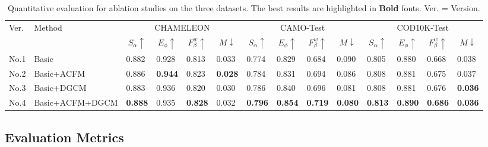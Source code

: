 \documentclass{article}
\begin{document}
\begin{table*}[h]
\caption{Quantitative evaluation for ablation studies on the three datasets. The best results are highlighted in \textbf{Bold} fonts. Ver. = Version.} \vspace{-0.25cm}
\renewcommand{\arraystretch}{0.75}
\setlength\tabcolsep{5.6pt}
\footnotesize
\begin{tabular}{l|l|llll|llll|llll}
\hline\toprule
\multirow{2}{*}{Ver.} & \multicolumn{1}{l|}{\multirow{2}{*}{Method}} & \multicolumn{4}{c|}{CHAMELEON} & \multicolumn{4}{c|}{CAMO-Test} & \multicolumn{4}{c}{COD10K-Test} \\ \cline{3-14} 
 & \multicolumn{1}{c|}{} & \multicolumn{1}{c}{$S_\alpha\uparrow$} & \multicolumn{1}{c}{$E_\phi\uparrow$} & \multicolumn{1}{c}{$F_\beta^w\uparrow$} & \multicolumn{1}{c|}{$M\downarrow$} & \multicolumn{1}{c}{$S_\alpha\uparrow$} & \multicolumn{1}{c}{$E_\phi\uparrow$} & \multicolumn{1}{c}{$F_\beta^w\uparrow$} & \multicolumn{1}{c|}{$M\downarrow$} & \multicolumn{1}{c}{$S_\alpha\uparrow$} & \multicolumn{1}{c}{$E_\phi\uparrow$} & \multicolumn{1}{c}{$F_\beta^w\uparrow$} & \multicolumn{1}{c}{$M\downarrow$} \\ \midrule
No.1 & Basic &0.882  &0.928  &0.813  &0.033  &0.774  &0.829  &0.684  &0.090  &0.805  &0.880  &0.668  &0.038  \\ \midrule
No.2 & Basic+ACFM &0.886 &\textbf{0.944}  &0.823  &\textbf{0.028}  &0.784  &0.831  &0.694  &0.086  &0.808  &0.881  &0.675  &0.037  \\ \midrule
No.3 & Basic+DGCM &0.883 &0.936  &0.820  &0.030  &0.786  &0.840  &0.696  &0.081  &0.808  &0.881  &0.676  &\textbf{0.036}  \\ \midrule
No.4 & Basic+ACFM+DGCM &\textbf{0.888}  &0.935  &\textbf{0.828}  &{0.032}  &\textbf{0.796}  &\textbf{0.854}  &\textbf{0.719}  &\textbf{0.080}  &\textbf{0.813}  &\textbf{0.890}  &\textbf{0.686}  &\textbf{0.036}  \\ \bottomrule
\hline
\end{tabular}
\label{tab2}
\end{table*}

\subsection{Evaluation Metrics}

\end{document}
